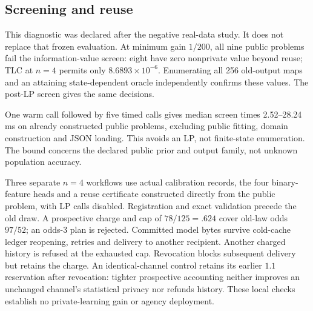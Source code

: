 \subsection{Screening and reuse}
\label{app:screened-release}
This diagnostic was declared after the negative real-data study. It
does not replace that frozen evaluation. At minimum gain $1/200$, all
nine public problems fail the information-value screen: eight have
zero nonprivate value beyond reuse; TLC at $n=4$ permits only
$8.6893\times10^{-6}$. Enumerating all 256 old-output maps and an
attaining state-dependent oracle independently confirms these values.
The post-LP screen gives the same decisions.

One warm call followed by five timed calls gives median screen times
2.52--28.24\,ms on already constructed public problems, excluding public
fitting, domain construction and JSON loading. This avoids an LP, not
finite-state enumeration. The bound concerns the declared public prior
and output family, not unknown population accuracy.

Three separate $n=4$ workflows use actual calibration records, the four
binary-feature heads and a reuse certificate constructed directly from
the public problem, with LP calls disabled. Registration and exact
validation precede the old draw. A prospective charge and cap of
$78/125=.624$ cover old-law odds $97/52$; an odds-$3$ plan is rejected.
Committed model bytes survive cold-cache ledger reopening, retries and
delivery to another recipient. Another charged history is refused at
the exhausted cap. Revocation blocks subsequent delivery but retains
the charge. An identical-channel control retains its earlier $1.1$
reservation after revocation: tighter prospective accounting neither
improves an unchanged channel's statistical privacy nor refunds history.
These local checks establish no private-learning gain or agency deployment.
